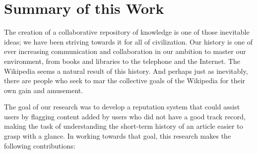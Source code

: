 \section{Summary of this Work}

The creation of a collaborative repository of knowledge is
one of those inevitable ideas; we have been striving towards it
for all of civilization.
Our history is one of ever increasing communication and collaboration
in our ambition to master our environment, from books and libraries
to the telephone and the Internet.
The Wikipedia seems a natural result of this history.
And perhaps just as inevitably, there are people who seek to
mar the collective goals of the Wikipedia for their own gain and amusement.

The goal of our research was to develop a reputation system
that could assist users by flagging content added by users who
did not have a good track record, making the task of understanding
the short-term history of an article easier to grasp with a glance.
In working towards that goal, this research makes the following contributions:
